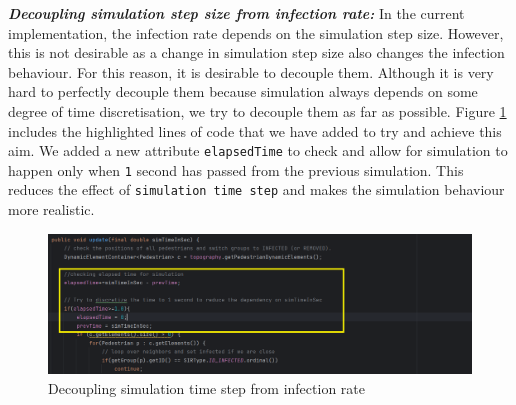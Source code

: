 \textit{\textbf{Decoupling simulation step size from infection rate:}} In the current implementation, the infection rate depends on the simulation step size. However, this is not desirable as a change in simulation step size also changes the infection behaviour. For this reason, it is desirable to decouple them. Although it is very hard to perfectly decouple them because simulation always depends on some degree of time discretisation, we try to decouple them as far as possible. Figure \ref{fig:decoupling} includes the highlighted lines of code that we have added to try and achieve this aim. We added a new attribute \texttt{elapsedTime} to check and allow for simulation to happen only when \texttt{1} second has passed from the previous simulation. This reduces the effect of \texttt{simulation time step} and makes the simulation behaviour more realistic.
\begin{figure}[H]
    \centering
    \includegraphics[width = \linewidth]{images/decoupling.png}
    \caption{Decoupling simulation time step from infection rate}
    \label{fig:decoupling}
\end{figure}

